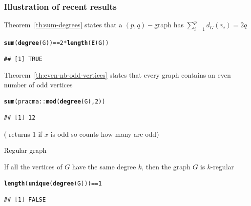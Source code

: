 \documentclass[aspectratio=169]{beamer}\usepackage[]{graphicx}\usepackage[]{xcolor}
\makeatletter
\newcommand{\hlnum}[1]{\textcolor[rgb]{0.686,0.059,0.569}{#1}}%
\newcommand{\hlopt}[1]{\textcolor[rgb]{0,0,0}{#1}}%
\newcommand{\hldef}[1]{\textcolor[rgb]{0.345,0.345,0.345}{#1}}%
\newcommand{\hlkwd}[1]{\textcolor[rgb]{0.737,0.353,0.396}{\textbf{#1}}}%
\newenvironment{kframe}{%
 \def\at@end@of@kframe{}%
 \ifinner\ifhmode%
  \def\at@end@of@kframe{\end{minipage}}%
  \begin{minipage}{\columnwidth}%
 \fi\fi%
 \def\FrameCommand##1{\hskip\@totalleftmargin \hskip-\fboxsep
 \colorbox{shadecolor}{##1}\hskip-\fboxsep
     \hskip-\linewidth \hskip-\@totalleftmargin \hskip\columnwidth}%
 \MakeFramed {\advance\hsize-\width
   \@totalleftmargin\z@ \linewidth\hsize
   \@setminipage}}%
 {\par\unskip\endMakeFramed%
 \at@end@of@kframe}
\newenvironment{knitrout}{}{} %
\makeatother
\begin{document}
\begin{frame}[fragile]\frametitle{Illustration of recent results}
Theorem~\ref{th:sum-degrees} states that a $(p,q)-$graph has $\sum_{i=1}^{p}d_G(v_i)=2q$
\begin{knitrout}
\color{fgcolor}\begin{kframe}
\begin{alltt}
\hlkwd{sum}\hldef{(}\hlkwd{degree}\hldef{(G))} \hlopt{==} \hlnum{2}\hlopt{*}\hlkwd{length}\hldef{(}\hlkwd{E}\hldef{(G))}
\end{alltt}
\begin{verbatim}
## [1] TRUE
\end{verbatim}
\end{kframe}
\end{knitrout}
\vfill
Theorem~\ref{th:even-nb-odd-vertices} states that every graph contains an even number of odd vertices
\begin{knitrout}
\color{fgcolor}\begin{kframe}
\begin{alltt}
\hlkwd{sum}\hldef{(pracma}\hlopt{::}\hlkwd{mod}\hldef{(}\hlkwd{degree}\hldef{(G),}\hlnum{2}\hldef{))}
\end{alltt}
\begin{verbatim}
## [1] 12
\end{verbatim}
\end{kframe}
\end{knitrout}
( returns 1 if $x$ is odd so  counts how many are odd)
\end{frame}

\begin{frame}[fragile]{Regular graph}
\begin{definition}
	If all the vertices of $G$ have the same degree $k$, then the graph $G$ is $k$-regular
\end{definition}
\vfill
\begin{knitrout}
\color{fgcolor}\begin{kframe}
\begin{alltt}
\hlkwd{length}\hldef{(}\hlkwd{unique}\hldef{(}\hlkwd{degree}\hldef{(G)))} \hlopt{==} \hlnum{1}
\end{alltt}
\begin{verbatim}
## [1] FALSE
\end{verbatim}
\end{kframe}
\end{knitrout}
\end{frame}
\end{document}
